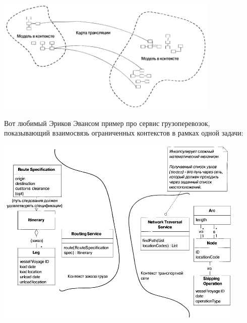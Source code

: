 \documentclass[a5paper]{article}
\begin{document}
\begin{center}
    \includegraphics[width=0.8\textwidth]{contextMap.png}
\end{center}

Вот любимый Эриков Эвансом пример про сервис грузоперевозок, показывающий взаимосвязь ограниченных контекстов в рамках одной задачи: 

\begin{center}
    \includegraphics[width=0.9\textwidth]{contextBoundariesExample.png}
\end{center}
\end{document}
